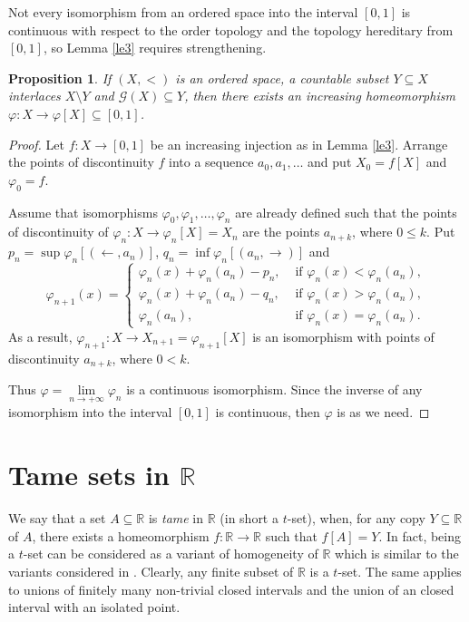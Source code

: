 \documentclass[12pt,a4paper,leqno]{amsart}
\renewcommand{\phi}{\varphi}
\newtheorem{pro}[thm]{Proposition}
\theoremstyle{definition}
\begin{document}
Not every isomorphism from an ordered space into the interval $[0,1]$ is continuous with respect to the order topology and the  topology hereditary from  $[0,1]$, so Lemma \ref{le3} requires strengthening.  
 \begin{pro}\label{po4} 
If $(X,<)$ is an ordered space,  a countable subset $Y \subseteq X$ interlaces $X\setminus Y$ and $\mathcal G(X)\subseteq Y$, then  there exists an increasing homeomorphism $\phi\colon X \to \phi[X] \subseteq [0,1]$.    
  \end{pro}
\begin{proof} Let $f\colon X \to [0,1]$ be an increasing injection as in Lemma \ref{le3}. Arrange the points of discontinuity $f$ into a sequence $a_0, a_1, \ldots $ and  put $X_0=f[X]$ and $\phi_0=f.$

Assume that isomorphisms $\phi_0, \phi_1, \ldots, \phi_n$ are already defined such that the points of discontinuity of $\phi_n\colon X \to \phi_n[X]=X_{n}$ are  the points  $ a_{n+k}$, where $0\leqslant k$.  Put 
   $p_n=\sup \phi_n [ (\leftarrow, a_{n})]$, $q_n=\inf \phi_n[ ( a_{n}, \rightarrow)]$ and 
$$\phi_{n+1}(x) =\begin{cases} 
\phi_n(x) + \phi_n(a_n) - p_n, & \mbox{ if } \phi_n(x)<\phi_n(a_n),\\
\phi_n(x) + \phi_n(a_n) - q_n, & \mbox{ if } \phi_n(x)>\phi_n(a_n),\\
\phi_n(a_n),& \mbox { if } \phi_n(x)=\phi_n(a_n).\end{cases}  $$
As a result, $\phi_{n+1}\colon X \to X_{n+1}=\phi_{n+1}[X]$ is an isomorphism with points of discontinuity $a_{n+k}$, where $0 < k$. 

Thus $\phi= \lim\limits_{n\to +\infty} \phi_n$ is a continuous isomorphism. Since the inverse of any isomorphism into the interval $[0,1]$ is  continuous, then $\phi$ is as we need. \end{proof}
 
\section{Tame sets in $\mathbb R$}



We say that a set $A\subseteq \mathbb R$ is \textit{tame} in $\mathbb R$ (in short a $ t $-set),  when, for any copy $Y\subseteq \mathbb R$ of $A$,  there exists a homeomorphism  $f\colon \mathbb R \to \mathbb R$   
such that $f[A]=Y$.   In fact, being a $t$-set can be considered as a variant of homogeneity of $\mathbb R$ which is similar to the variants considered in \cite{ompa}.
Clearly, any  finite subset of $\mathbb R$ is  a $ t $-set.   
The same applies to   unions of  finitely many non-trivial   closed intervals and the union of an closed interval with an isolated point.  
\end{document}
